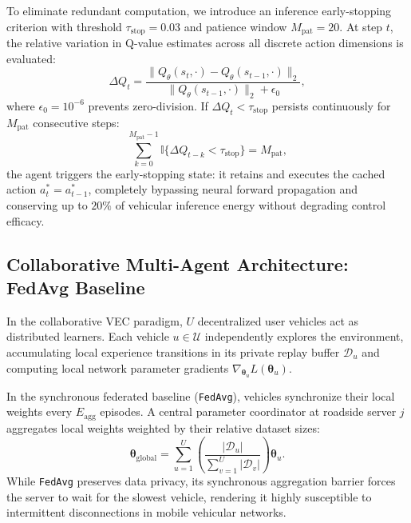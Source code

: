 \documentclass[12pt,a4paper]{article}
\begin{document}
To eliminate redundant computation, we introduce an inference early-stopping criterion with threshold $\tau_{\mathrm{stop}} = 0.03$ and patience window $M_{\mathrm{pat}} = 20$. At step $t$, the relative variation in Q-value estimates across all discrete action dimensions is evaluated:
\begin{equation}
\Delta Q_t = \frac{\|Q_{\theta}(s_t, \cdot) - Q_{\theta}(s_{t-1}, \cdot)\|_2}{\|Q_{\theta}(s_{t-1}, \cdot)\|_2 + \epsilon_0},
\label{eq:early_stop_metric}
\end{equation}
where $\epsilon_0 = 10^{-6}$ prevents zero-division. If $\Delta Q_t < \tau_{\mathrm{stop}}$ persists continuously for $M_{\mathrm{pat}}$ consecutive steps:
\begin{equation}
\sum_{k=0}^{M_{\mathrm{pat}}-1} \mathbb{I}\{\Delta Q_{t-k} < \tau_{\mathrm{stop}}\} = M_{\mathrm{pat}},
\label{eq:early_stop_condition}
\end{equation}
the agent triggers the early-stopping state: it retains and executes the cached action $a_t^* = a_{t-1}^*$, completely bypassing neural forward propagation and conserving up to $20\%$ of vehicular inference energy without degrading control efficacy.

\subsection{Collaborative Multi-Agent Architecture: FedAvg Baseline}
\label{subsec:fedavg_baseline}
In the collaborative VEC paradigm, $U$ decentralized user vehicles act as distributed learners. Each vehicle $u \in \mathcal{U}$ independently explores the environment, accumulating local experience transitions in its private replay buffer $\mathcal{D}_u$ and computing local network parameter gradients $\nabla_{\boldsymbol{\theta}_u} L(\boldsymbol{\theta}_u)$.

In the synchronous federated baseline (\texttt{FedAvg}), vehicles synchronize their local weights every $E_{\mathrm{agg}}$ episodes. A central parameter coordinator at roadside server $j$ aggregates local weights weighted by their relative dataset sizes:
\begin{equation}
\boldsymbol{\theta}_{\mathrm{global}} = \sum_{u=1}^U \left( \frac{|\mathcal{D}_u|}{\sum_{v=1}^U |\mathcal{D}_v|} \right) \boldsymbol{\theta}_u.
\label{eq:fedavg_aggregation}
\end{equation}
While \texttt{FedAvg} preserves data privacy, its synchronous aggregation barrier forces the server to wait for the slowest vehicle, rendering it highly susceptible to intermittent disconnections in mobile vehicular networks.
\end{document}
